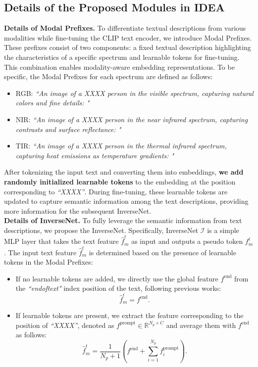 \subsection{Details of the Proposed Modules in IDEA}
\textbf{Details of Modal Prefixes.}
To differentiate textual descriptions from various modalities while fine-tuning the CLIP text encoder, we introduce Modal Prefixes.
%
These prefixes consist of two components: a fixed textual description highlighting the characteristics of a specific spectrum and learnable tokens for fine-tuning.
%
This combination enables modality-aware embedding representations.
%
To be specific, the Modal Prefixes for each spectrum are defined as follows:
\begin{itemize}
    \item RGB:
    {\small
    \textit{“An image of a XXXX person in the visible spectrum, capturing natural colors and fine details: "}}
    \item NIR:
    {\small
    \textit{“An image of a XXXX person in the near infrared spectrum, capturing contrasts and surface reflectance: "}}
    \item TIR:
    {\small
    \textit{“An image of a XXXX person in the thermal infrared spectrum, capturing heat emissions as temperature gradients: "}}
\end{itemize}
%
After tokenizing the input text and converting them into embeddings, \textbf{we add randomly initialized learnable tokens} to the embedding at the position corresponding to \textit{“XXXX”}.
%
During fine-tuning, these learnable tokens are updated to capture semantic information among the text descriptions, providing more information for the subsequent InverseNet.
\\
\textbf{Details of InverseNet.}
To fully leverage the semantic information from text descriptions, we propose the InverseNet.
%
Specifically, InverseNet $\mathcal{I}$ is a simple MLP layer that takes the text feature $\hat{f}^{t}_{m}$ as input and outputs a pseudo token ${f}^{t}_{m}$.
%
The input text feature $\hat{f}^{t}_{m}$ is determined based on the presence of learnable tokens in the Modal Prefixes:
\begin{itemize}
    \item If no learnable tokens are added, we directly use the global feature ${f}^{\text{end}}$ from the \textit{“endoftext"} index position of the text, following previous works:
    \begin{equation}
    \hat{f}^{t}_{m} = {f}^{\text{end}}.
    \end{equation}
    \item If learnable tokens are present, we extract the feature corresponding to the position of \textit{“XXXX”}, denoted as ${f}^{\text{prompt}} \in \mathbb{R}^{N_p \times C}$ and average them with ${f}^{\text{end}}$ as follows:
    \begin{equation}
    \hat{f}^{t}_{m} = \frac{1}{N_p + 1} \left( {f}^{\text{end}} + \sum_{i=1}^{N_p} {f}^{\text{prompt}}_i \right).
    \end{equation}
\end{itemize}
